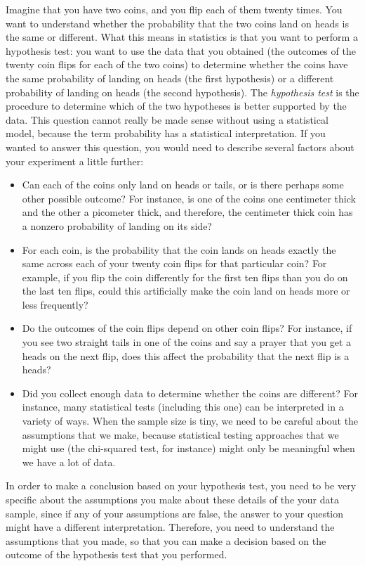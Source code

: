 Imagine that you have two coins, and you flip each of them twenty times. You want to understand whether the probability that the two coins land on heads is the same or different. What this means in statistics is that you want to perform a {hypothesis test}: you want to use the data that you obtained (the outcomes of the twenty coin flips for each of the two coins) to determine whether the coins have the same probability of landing on heads (the first hypothesis) or a different probability of landing on heads (the second hypothesis). The \textit{hypothesis test} is the procedure to determine which of the two hypotheses is better supported by the data. This question cannot really be made sense without using a statistical model, because the term {probability} has a statistical interpretation. If you wanted to answer this question, you would need to describe several factors about your experiment a little further:
\begin{itemize}
\item Can each of the coins {only} land on heads or tails, or is there perhaps some other possible outcome? For instance, is one of the coins one centimeter thick and the other a picometer thick, and therefore, the centimeter thick coin has a nonzero probability of landing on its side?
\item For each coin, is the probability that the coin lands on heads {exactly the same} across each of your twenty coin flips for that particular coin? For example, if you flip the coin differently for the first ten flips than you do on the last ten flips, could this artificially make the coin land on heads more or less frequently?
\item Do the outcomes of the coin flips depend on other coin flips? For instance, if you see two straight tails in one of the coins and say a prayer that you get a heads on the next flip, does this affect the probability that the next flip is a heads?
\item Did you collect enough data to determine whether the coins are different? For instance, many statistical tests (including this one) can be interpreted in a variety of ways. When the sample size is tiny, we need to be careful about the assumptions that we make, because statistical testing approaches that we might use (the chi-squared test, for instance) might only be meaningful when we have a lot of data.
\end{itemize}

In order to make a conclusion based on your hypothesis test, you need to be very specific about the assumptions you make about these details of the your data sample, since if any of your assumptions are false, the answer to your question might have a different interpretation. Therefore, you need to understand the assumptions that you made, so that you can make a {decision} based on the outcome of the hypothesis test that you performed.



